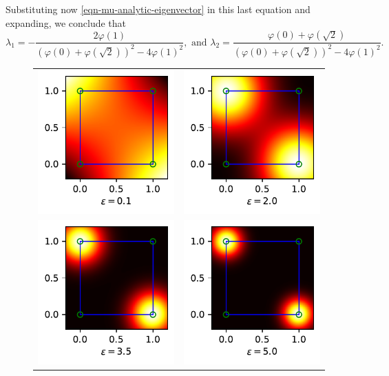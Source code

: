\documentclass[12pt]{report} %
\begin{document}
Substituting now \eqref{eqn-mu-analytic-eigenvector} in this last equation and expanding, we
conclude that \begin{equation}
\lambda_1 = - \frac{2 \varphi (1)}{\left( \varphi (0) + \varphi
\left( \sqrt{2} \right) \right)^2 - 4 \varphi (1)^2}, \text{ and } \lambda_2 =
\frac{\varphi (0) + \varphi \left( \sqrt{2} \right)}{\left( \varphi (0) +
\varphi \left( \sqrt{2} \right) \right)^2 - 4 \varphi (1)^2}.
    \label{eqn-lda1-lda2}
\end{equation}

\begin{figure}[ht]
    \centering
\begin{tabular}{ll}
 {\includegraphics[width=.33\textwidth]{imagenes/xor/xor0.1.pdf}} &  \includegraphics[width=.33\textwidth]{imagenes/xor/xor2.0.pdf} \\
 \includegraphics[width=.33\textwidth]{imagenes/xor/xor3.5.pdf} & \includegraphics[width=.33\textwidth]{imagenes/xor/xor5.0.pdf}

\end{tabular}
\end{figure}
\end{document}
